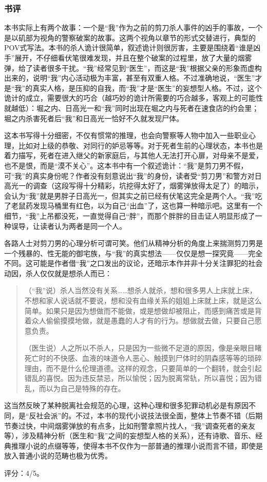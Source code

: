 \subsubsection{书评}

本书实际上有两个故事：一个是“我”作为之前的剪刀杀人事件的凶手的事故，一个是以矶部为视角的警察破案的故事。这两个视角以章节的形式交替进行，典型的POV式写法。本书的杀人诡计很简单，叙述诡计则很厉害，主要是围绕着“谁是凶手”展开，不仔细看伏笔很难发现，并且在整个破案的过程里，放了大量的烟雾弹，给了读者很多干扰。“我”经常见到“医生”，而这是“我”根据父亲的形象而虚构出来的，说明“我”内心活动极为丰富，甚至有双重人格。不过准确地说，“医生”才是“我”的真实人格，是压抑的自我，而“我”才是“医生”的妄想型人格。不过，这个诡计的成立，需要很大的巧合（越巧妙的诡计所需要的巧合越多，客观上的可能性就越低）：堀之内、日高光一和“我”同时出现在堀之内与死者在速食店的约会里；堀之内杀害死者后“我”和日高光一恰好不久就发现尸体。

这本书写得十分细密，不仅有惯常的推理，也会向警察等人物中加入一些职业心理，比如对上级的恭敬、对同行的妒忌等等。对于死者生前的心理状态，本书也是着力描写，死者在进入继父的新家庭后，与其他人无法打开心扉，对母亲不是爱，也不是恨，而是“漠不关心”。这本书中有一个叙述诡计：“我”是剪刀男不假，可“我”的真实身份呢？作者没有刻意说出“我”的身份，读者受“剪刀男”和警方对日高光一的调查（这段写得十分精彩，坑挖得太好了，烟雾弹放得太足了）的暗示，会认为“我”就是男胖子日高光一，但其实之前已经有伏笔这完全是两个人。“我”吃了老鼠药发现马桶里有红色，以为自己“出血”了，这也算一种暗示吧。这里有一个细节，“我”上吊都没死，一直觉得自己“胖”，而那个胖胖的目击证人明显形成了一种误导，让读者认为两者是同一个人。

各路人士对剪刀男的心理分析可谓可笑。他们从精神分析的角度上来揣测剪刀男是一个残暴的、性无能的御宅族，与“我”的真实想法——仅仅是想一探究竟——完全不同。这可能是作者借“我”之口发出的议论，还暗示本作并非十分关注罪犯的社会动因，杀人仅仅就是想杀人而已：
\begin{quotation}
（“我”说）杀人当然没有关系……想杀人就杀，想和很多男人上床就上床，不想和家人说话就不要说，想和没有血缘关系的姐姐上床就上床，就是这么简单。如果只是因为想做而不能做，或是想做却被阻止，而感到痛苦或是背着众人偷偷摸摸地做，就是愚蠢的人才有的行为。想做就去做，只要自己愿意负责。

（医生说）人之所以不杀人，只是因为一些微不足道的原因，像是亲眼目睹死亡时的不快感、血液的味道令人恶心、触摸到尸体时的阴森感等等的琐碎理由，而不是什么伦理道德。这样的观念，只要简单的一个翻转，就会引起错乱的喜悦。因为违反禁忌，所以愉悦；因为脱离常轨，所以喜悦；因为错乱，而以为自己是特殊的存在。
\end{quotation}

这当然反映了某种脱离社会规范的心理，这种心理和很多犯罪动机必是有原因不同，是“反社会派”的。不过，本书的现代小说技法很全面，整体上节奏不错（后期节奏过快，中间烟雾弹放的有点多，比如刑警拿照片找人，“我”调查死者的亲友等），涉及精神分析（医生和“我”之间的妄想型人格的关系），还有诗歌、音乐、经典推理小说的点缀等等，使得本书不仅作为一部普通的推理小说而言不错，即使是放入普通小说的范畴也极为优秀。

评分：4/5。